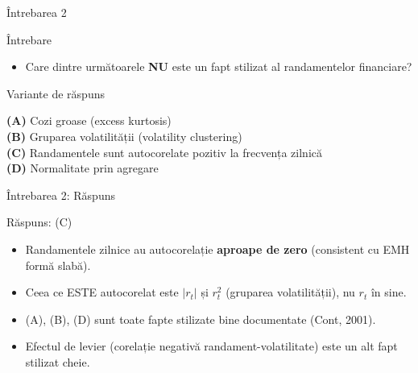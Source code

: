 \documentclass[9pt, aspectratio=169, t]{beamer}
\theoremstyle{definition}
\newenvironment{cminipage}[1]{%
    \par\noindent\hfill\begin{minipage}{#1}\ignorespaces
}{%
    \end{minipage}\hfill\null\par
}
\begin{document}
\begin{frame}{Întrebarea 2}
    \begin{cminipage}{0.95\textwidth}
    \begin{alertblock}{Întrebare}
        \begin{itemize}
            \item Care dintre următoarele \textbf{NU} este un fapt stilizat al randamentelor financiare?
        \end{itemize}
    \end{alertblock}

    \vspace{0.3cm}

    \begin{block}{Variante de răspuns}

        \textcolor{MainBlue}{\textbf{(A)}} Cozi groase (excess kurtosis)\\[3pt]

        \textcolor{MainBlue}{\textbf{(B)}} Gruparea volatilității (volatility clustering)\\[3pt]

        \textcolor{MainBlue}{\textbf{(C)}} Randamentele sunt autocorelate pozitiv la frecvența zilnică\\[3pt]

        \textcolor{MainBlue}{\textbf{(D)}} Normalitate prin agregare

    \end{block}
    \end{cminipage}
\end{frame}

\begin{frame}{Întrebarea 2: Răspuns}
    \begin{cminipage}{0.95\textwidth}
    \begin{exampleblock}{Răspuns: (C)}
    \begin{itemize}
        \item Randamentele zilnice au autocorelație \textbf{aproape de zero} (consistent cu EMH formă slabă).
        \item Ceea ce ESTE autocorelat este $|r_t|$ și $r_t^2$ (gruparea volatilității), nu $r_t$ în sine.
        \item (A), (B), (D) sunt toate fapte stilizate bine documentate (Cont, 2001).
        \item Efectul de levier (corelație negativă randament-volatilitate) este un alt fapt stilizat cheie.
    \end{itemize}
    \end{exampleblock}
    \end{cminipage}
\end{frame}
\end{document}
